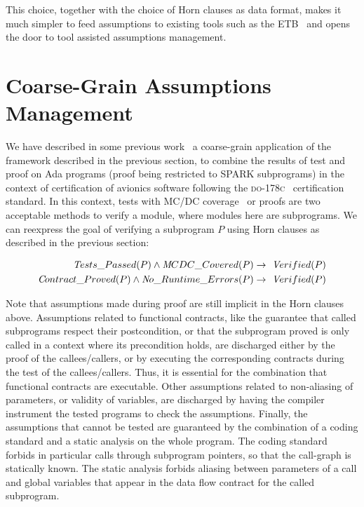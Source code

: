 \documentclass{llncs}
\newcommand{\DOC}{\textsc{do-178c}\xspace}
\newcommand{\spark}{SPARK\xspace}
\begin{document}
This choice, together with the choice of Horn clauses as data format, makes it
much simpler to feed assumptions to existing tools such as the
ETB~\cite{cruanes2013tool} and opens the door to tool assisted assumptions
management.

\section{Coarse-Grain Assumptions Management}
\label{sec:test-and-proof}

We have described in some previous work~\cite{hiliteERTS2012} a coarse-grain
application of the framework described in the previous section, to combine the
results of test and proof on Ada programs (proof being restricted to \spark
subprograms) in the context of certification of avionics software following
the \DOC~\cite{do178c} certification standard.
In this context, tests
with MC/DC coverage~\cite{ar0118} or proofs are two acceptable methods to verify a
module, where modules here are subprograms. We can reexpress the
goal of verifying a subprogram $P$ using Horn clauses as described in the previous section:

\begin{eqnarray*}
   {\textit Tests\_Passed}(P) \wedge {\textit MCDC\_Covered}(P) \rightarrow\ {\textit Verified(P)}\\
   {\textit Contract\_Proved}(P) \wedge {\textit No\_Runtime\_Errors}(P) \rightarrow\ {\textit Verified(P)}
\end{eqnarray*}

Note that assumptions made during proof are still implicit in the Horn clauses
above. Assumptions related to functional contracts, like the guarantee that
called subprograms respect their postcondition, or that the subprogram proved
is only called in a context where its precondition holds, are discharged either
by the proof of the callees/callers, or by executing the corresponding
contracts during the test of the callees/callers. Thus, it is essential for the
combination that functional contracts are executable. Other assumptions related
to non-aliasing of parameters, or validity of variables, are discharged by
having the compiler instrument the tested programs to check the
assumptions. Finally, the assumptions that cannot be tested are guaranteed by
the combination of a coding standard and a static analysis on the whole program.
The coding standard forbids in particular calls
through subprogram pointers, so that the call-graph is statically known.
The static analysis forbids aliasing between parameters of a call and global
variables that appear in the data flow contract for the called subprogram.
\end{document}
